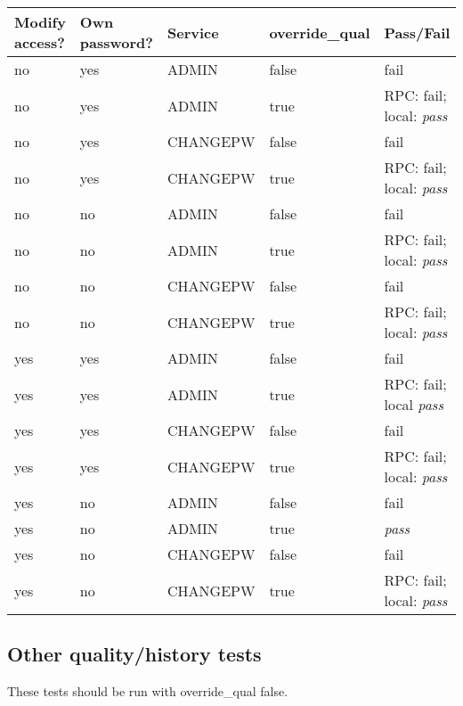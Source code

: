 \begin{tabular}{lllll}
Modify access? & Own password? & Service & override_qual & Pass/Fail \\ \hline
no & yes & ADMIN & false & fail \\
no & yes & ADMIN & true & RPC: fail; local: {\em pass} \\
no & yes & CHANGEPW & false & fail \\
no & yes & CHANGEPW & true & RPC: fail; local: {\em pass} \\
no & no & ADMIN & false & fail \\
no & no & ADMIN & true & RPC: fail; local: {\em pass} \\
no & no & CHANGEPW & false & fail \\
no & no & CHANGEPW & true & RPC: fail; local: {\em pass} \\
yes & yes & ADMIN & false & fail \\
yes & yes & ADMIN & true & RPC: fail; local {\em pass} \\
yes & yes & CHANGEPW & false & fail \\
yes & yes & CHANGEPW & true & RPC: fail; local: {\em pass} \\
yes & no & ADMIN & false & fail \\
yes & no & ADMIN & true & {\em pass} \\
yes & no & CHANGEPW & false & fail \\
yes & no & CHANGEPW & true & RPC: fail; local: {\em pass}
\end{tabular}

\subsection{Other quality/history tests}

These tests should be run with override_qual false.






